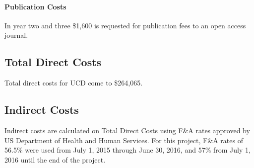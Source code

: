 \documentclass[11pt,letterpaper]{article}
\begin{document}

\paragraph{Publication Costs}
In year two and three \$1,600 is requested for publication fees to an open access journal. 

\subsection*{Total Direct Costs}

Total direct costs for UCD come to \$264,065.  

\subsection*{Indirect Costs}
Indirect costs are calculated on Total Direct Costs using F\&A rates approved by US Department of Health and Human Services. For this project, F\&A rates of 56.5\% were used from July 1, 2015 through June 30, 2016, and 57\% from July 1, 2016 until the end of the project.
\end{document}
